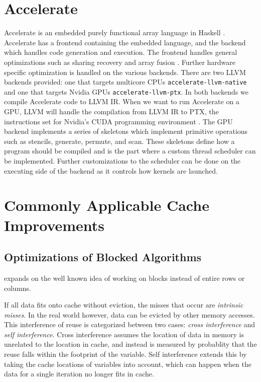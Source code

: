 \section{Accelerate}
\label{sec:accelerate}
Accelerate is an embedded purely functional array language in Haskell \cite{chakravarty2011accelerating}.
Accelerate has a frontend containing the embedded language, and the backend which handles code generation and execution.
The frontend handles general optimizations such as sharing recovery and array fusion \cite{mcdonell2013optimising,balen2020optimal}.
Further hardware specific optimization is handled on the various backends.
There are two LLVM \cite{llvm} backends provided: one that targets multicore CPUs \texttt{accelerate-llvm-native} and one that targets Nvidia GPUs \texttt{accelerate-llvm-ptx}.
In both backends we compile Accelerate code to LLVM IR.
When we want to run Accelerate on a GPU, LLVM will handle the compilation from LLVM IR to PTX, the instructions set for Nvidia's CUDA programming environment \cite{mcdonell2015type, llvm, nvidia2021cudadocs}.
The GPU backend implements a series of skeletons which implement primitive operations such as stencils, generate, permute, and scan.
These skeletons define how a program should be compiled and is the part where a custom thread scheduler can be implemented.
Further customizations to the scheduler can be done on the executing side of the backend as it controls how kernels are launched.

\section{Commonly Applicable Cache Improvements}

\subsection{Optimizations of Blocked Algorithms}
\label{sec:optimization_blocked}
\citeauthor{lam1991cache} expands on the well known idea of working on blocks instead of entire rows or columns.

If all data fits onto cache without eviction, the misses that occur are \textit{intrinsic misses}.
In the real world however, data can be evicted by other memory accesses.
This interference of reuse is categorized between two cases: \textit{cross interference} and \textit{self interference}.
Cross interference assumes the location of data in memory is unrelated to the location in cache, and instead is measured by probablity that the reuse falls within the footprint of the variable.
Self interference extends this by taking the cache locations of variables into account, which can happen when the data for a single iteration no longer fits in cache.
\cite{lam1991cache}

